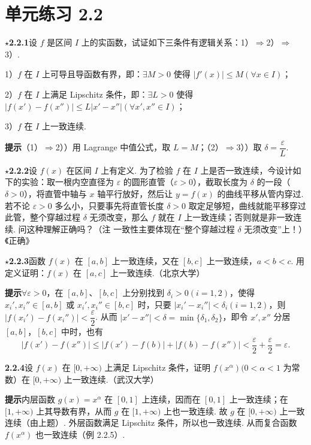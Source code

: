 \documentclass[UTF8, 12pt, fontset=fandol, oneside]{ctexart}
\begin{document}
\section*{单元练习 2.2}

\noindent\textbf{$\star$2.2.1}\quad 设 $f$ 是区间 $I$ 上的实函数，试证如下三条件有逻辑关系：1）$\Rightarrow$2）$\Rightarrow$3）.

1）$f$ 在 $I$ 上可导且导函数有界，即：$\exists M>0$ 使得 $|f'(x)|\le M(\forall x\in I)$；

2）$f$ 在 $I$ 上满足 Lipschitz 条件，即：$\exists L>0$ 使得 $|f(x')-f(x'')|\le L|x'-x''|(\forall x',x''\in I)$；

3）$f$ 在 $I$ 上一致连续.

\noindent\textbf{提示}\quad （1）$\Rightarrow$2））用 Lagrange 中值公式，取 $L=M$；（2）$\Rightarrow$3））取 $\delta=\dfrac\varepsilon L$.

\noindent\textbf{$\star$2.2.2}\quad 设 $f(x)$ 在区间 $I$ 上有定义. 为了检验 $f$ 在 $I$ 上是否一致连续，今设计如下的实验：取一根内空直径为 $\varepsilon$ 的圆形直管（$\varepsilon>0$），截取长度为 $\delta$ 的一段（$\delta>0$），将直管中轴与 $x$ 轴平行放好，然后让 $y=f(x)$ 的曲线平移从管内穿过. 若不论 $\varepsilon>0$ 多么小，只要事先将直管长度 $\delta>0$ 取定足够短，曲线就能平移穿过此管，整个穿越过程 $\delta$ 无须改变，那么 $f$ 就在 $I$ 上一致连续；否则就是非一致连续. 问这种理解正确吗？（注 一致性主要体现在“整个穿越过程 $\delta$ 无须改变”上！）\hfill《正确》

\noindent\textbf{$\star$2.2.3}\quad 函数 $f(x)$ 在 $[a,b]$ 上一致连续，又在 $[b,c]$ 上一致连续，$a<b<c$. 用定义证明：$f(x)$ 在 $[a,c]$ 上一致连续.（北京大学）

\noindent\textbf{提示}\quad $\forall\varepsilon>0$，在 $[a,b]$、$[b,c]$ 上分别找到 $\delta_i>0(i=1,2)$，使得 $x_i',x_i''\in[a,b]$ 或 $x_i',x_i''\in[b,c]$ 时，只要 $|x_i'-x_i''|<\delta_i(i=1,2)$，则 $|f(x_i')-f(x_i'')|<\dfrac\varepsilon2$. 从而 $|x'-x''|<\delta=\min\{\delta_1,\delta_2\}$，即令 $x',x''$ 分居 $[a,b]$，$[b,c]$ 中时，也有
\[
  |f(x')-f(x'')|\le |f(x')-f(b)|+|f(b)-f(x'')|<\frac\varepsilon2+\frac\varepsilon2=\varepsilon.
\]

\noindent\textbf{2.2.4}\quad 设 $f(x)$ 在 $[0,+\infty)$ 上满足 Lipschitz 条件，证明 $f(x^\alpha)(0<\alpha<1$ 为常数）在 $[0,+\infty)$ 上一致连续.（武汉大学）

\noindent\textbf{提示}\quad 内层函数 $g(x)=x^\alpha$ 在 $[0,1]$ 上连续，因而在 $[0,1]$ 上一致连续；在 $[1,+\infty)$ 上其导数有界，从而 $g$ 在 $[1,+\infty)$ 上也一致连续. 故 $g$ 在 $[0,+\infty)$ 上一致连续（由上题）. 外层函数满足 Lipschitz 条件，所以也一致连续. 从而复合函数 $f(x^\alpha)$ 也一致连续（例 2.2.5）.
\end{document}
